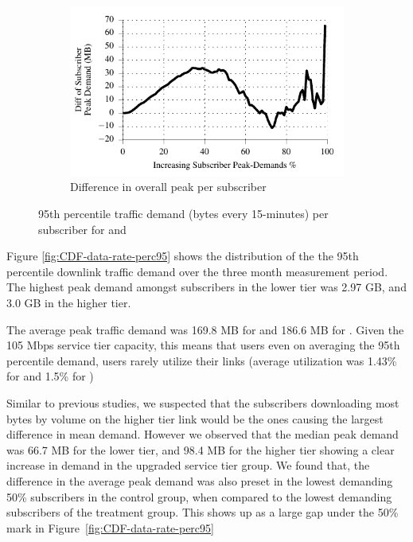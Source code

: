 \begin{figure}[t]
\begin{minipage}{1\linewidth}
\begin{subfigure}[b]{1\linewidth}
\includegraphics[width=\linewidth]{figures/diff_perc95_bytes_subsc-overall_01.pdf}		%
               \caption{Difference in overall peak per subscriber\label{fig:diff-peak-overall}}
\end{subfigure}
%
\end{minipage}
\caption{95th percentile traffic demand (bytes every 15-minutes) per subscriber for \control{} and \treatment{}\label{fig:traffic-demand-overall}}
\end{figure}

Figure \ref{fig:CDF-data-rate-perc95} shows the distribution of the
the 95th percentile downlink traffic demand 
over the three month measurement period. The highest peak
demand amongst subscribers in the lower tier was 2.97 GB,
and 3.0 GB in the higher tier.

The average peak traffic demand was 169.8 MB for \control{} and
186.6 MB for \treatment{}. Given the 105 Mbps service tier capacity,
this means that users even on averaging the 95th percentile demand,
users rarely utilize their links (average utilization was 1.43\%
for \control{} and 1.5\% for \treatment{})

Similar to previous studies, we suspected that the subscribers downloading most bytes
by volume on the higher tier link would be the ones causing the largest difference
in mean demand. However we observed that the median peak demand 
was 66.7 MB for the lower tier, and 98.4 MB for the higher tier
showing a clear increase in demand in the upgraded service tier
group. We found that, the difference in the average peak demand
was also preset in the lowest demanding 50\% subscribers
in the control group, when compared to the lowest demanding subscribers of the treatment
group. This shows up as a large gap under the 50\% mark in Figure~\ref{fig:CDF-data-rate-perc95}


